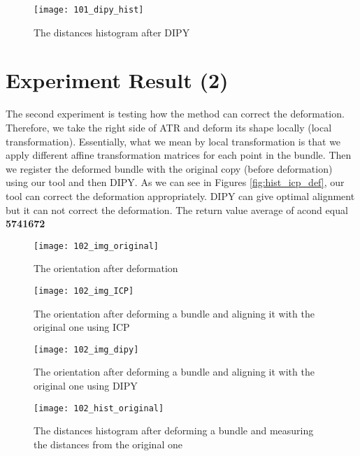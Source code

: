 \documentclass[../structure.tex]{subfiles}
\begin{document}
\begin{figure}[h!]
\centering
\texttt{[image: 101\_dipy\_hist]}
\captionsetup{justification=centering}
\caption{The distances histogram after DIPY}
\label{fig:hist_dipy}
\end{figure}

\section{Experiment Result (2)}
The second experiment is testing how the method can correct the deformation. Therefore, we take the right side of ATR and deform its shape locally (local transformation). Essentially, what we mean by local transformation is that we apply different affine transformation matrices for each point in the bundle. Then we register the deformed bundle with the original copy (before deformation) using our tool and then DIPY. As we can see in Figures \ref{fig:hist_icp_def}, our tool can correct the deformation appropriately. DIPY can give optimal alignment but it can not correct the deformation. The return value average of acond equal \textbf{5741672}

\begin{figure}[h!]
\centering
\texttt{[image: 102\_img\_original]}
\captionsetup{justification=centering}
\caption{The orientation after deformation}
\label{fig:img_original_def}
\end{figure}

\begin{figure}[h!]
\centering
\texttt{[image: 102\_img\_ICP]}
\captionsetup{justification=centering}
\caption{The orientation after deforming a bundle and aligning it with the original one using ICP}
\label{fig:img_icp_def}
\end{figure}

\begin{figure}[h!]
\centering
\texttt{[image: 102\_img\_dipy]}
\captionsetup{justification=centering}
\caption{The orientation after deforming a bundle and aligning it with the original one using DIPY}
\label{fig:img_dipy_def}
\end{figure}

\begin{figure}[h!]
\centering
\texttt{[image: 102\_hist\_original]}
\captionsetup{justification=centering}
\caption{The distances histogram after deforming a bundle and measuring the distances from the original one}
\label{fig:hist_original_def}
\end{figure}
\end{document}
